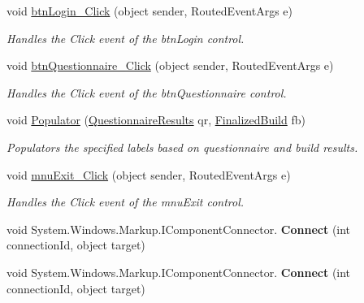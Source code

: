 \begin{DoxyCompactItemize}
\item 
void \hyperlink{class_p_c_builder_forms_1_1_main_window_a9b54f303aa5413af93c5565e64a62712}{btn\+Login\+\_\+\+Click} (object sender, Routed\+Event\+Args e)
\begin{DoxyCompactList}\small\item\em Handles the Click event of the btn\+Login control. \end{DoxyCompactList}\item 
void \hyperlink{class_p_c_builder_forms_1_1_main_window_a1e5ca63166c0a4fd384e436ba3ff262a}{btn\+Questionnaire\+\_\+\+Click} (object sender, Routed\+Event\+Args e)
\begin{DoxyCompactList}\small\item\em Handles the Click event of the btn\+Questionnaire control. \end{DoxyCompactList}\item 
void \hyperlink{class_p_c_builder_forms_1_1_main_window_a239a3300ed5f9483736a1281c65078d6}{Populator} (\hyperlink{class_business_objects_1_1_questionnaire_results}{Questionnaire\+Results} qr, \hyperlink{class_business_objects_1_1_finalized_build}{Finalized\+Build} fb)
\begin{DoxyCompactList}\small\item\em Populators the specified labels based on questionnaire and build results. \end{DoxyCompactList}\item 
void \hyperlink{class_p_c_builder_forms_1_1_main_window_a69ec1e9eb373538650099946307dfd77}{mnu\+Exit\+\_\+\+Click} (object sender, Routed\+Event\+Args e)
\begin{DoxyCompactList}\small\item\em Handles the Click event of the mnu\+Exit control. \end{DoxyCompactList}\item 
void System.\+Windows.\+Markup.\+I\+Component\+Connector. {\bfseries Connect} (int connection\+Id, object target)\hypertarget{class_p_c_builder_forms_1_1_main_window_ab17677546c3e5a4c380ddcdff1d9aab1}{}\label{class_p_c_builder_forms_1_1_main_window_ab17677546c3e5a4c380ddcdff1d9aab1}

\item 
void System.\+Windows.\+Markup.\+I\+Component\+Connector. {\bfseries Connect} (int connection\+Id, object target)\hypertarget{class_p_c_builder_forms_1_1_main_window_ab17677546c3e5a4c380ddcdff1d9aab1}{}\label{class_p_c_builder_forms_1_1_main_window_ab17677546c3e5a4c380ddcdff1d9aab1}

\end{DoxyCompactItemize}
